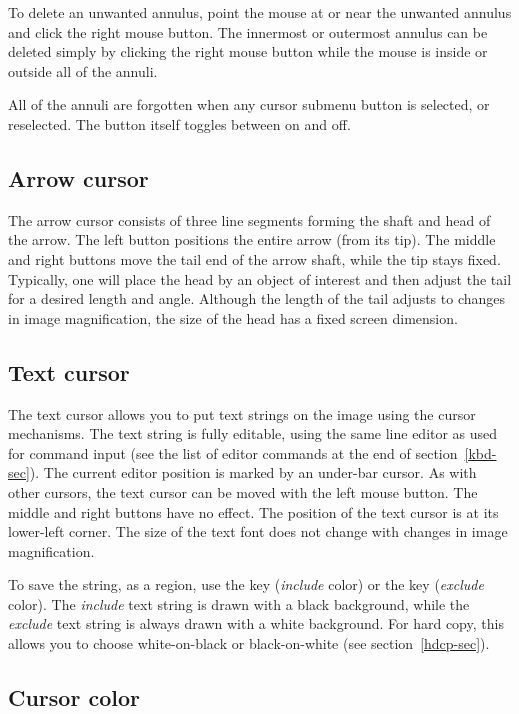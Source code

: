 To delete an unwanted annulus, point the mouse at or near the unwanted
annulus and click the right mouse button.  The innermost or outermost
annulus can be deleted simply by clicking the right mouse button while
the mouse is inside or outside all of the annuli.

All of the annuli are forgotten when any cursor submenu button is
selected, or reselected.  The  button itself toggles between on
and off.

\subsection{ Arrow cursor }

The arrow cursor consists of three line segments forming the shaft
and head of the arrow.  The left button positions the entire arrow (from
its tip).  The middle and right buttons move the tail end of the
arrow shaft, while the tip stays fixed.  Typically, one will place the
head by an object of interest and then adjust the tail for a desired
length and angle.  Although the length of the tail adjusts to changes in
image magnification, the size of the head has a fixed screen dimension.

\subsection{ Text cursor }

The text cursor allows you to put text strings on the image using the
cursor mechanisms.  The text string is fully editable, using the same
line editor as used for command input (see the list of editor commands
at the end of section~\ref{kbd-sec}).  The current editor position
is marked by an under-bar cursor.  As with other cursors, the text cursor
can be moved with the left mouse button.  The middle and right buttons
have no effect.  The position of the text cursor is at its lower-left
corner.  The size of the text font does not change with changes in image
magnification.

To save the string, as a region, use the  key ({\em include} color)
or the  key ({\em exclude} color).  The {\em include} text string is drawn with a black
background, while the {\em exclude} text string is always drawn with a white
background.  For hard copy, this allows you to choose white-on-black
or black-on-white  (see section~\ref{hdcp-sec}).

\subsection{ Cursor color } \label{halftone-sec}

